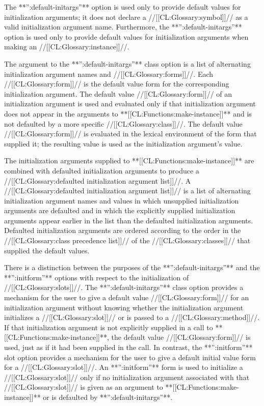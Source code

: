 The **'':default-initargs''** option is used only to provide default
values for initialization arguments; it does not declare a //[[CL:Glossary:symbol]]// 
as a valid initialization argument name.  Furthermore, 
the **'':default-initargs''** option is used only to provide default values for
initialization arguments when making an //[[CL:Glossary:instance]]//.
                     
The argument to the **'':default-initargs''** class 
option is a list of
alternating initialization argument names and //[[CL:Glossary:forms]]//.  
Each //[[CL:Glossary:form]]// is the
default  value form for the corresponding initialization
argument.  The default  value //[[CL:Glossary:form]]// of an initialization
argument is used and evaluated only if that initialization argument
does not appear in the arguments to **[[CL:Functions:make-instance]]** and is not
defaulted by a more specific //[[CL:Glossary:class]]//.  The default  value //[[CL:Glossary:form]]// is
evaluated in the lexical environment of the  form that
supplied it; the resulting value is used as the initialization
argument's value.
                                          
The initialization arguments supplied to **[[CL:Functions:make-instance]]** are combined
with defaulted initialization arguments to produce a 
//[[CL:Glossary:defaulted initialization argument list]]//. A 
//[[CL:Glossary:defaulted initialization argument list]]//
is a list of alternating initialization argument names and
values in which unsupplied initialization arguments are defaulted and in
which the explicitly supplied initialization arguments appear earlier in
the list than the defaulted initialization arguments.  Defaulted
initialization arguments are ordered according to the order in the 
//[[CL:Glossary:class precedence list]]// of the //[[CL:Glossary:classes]]// that supplied the default values.
                                                    
There is a distinction between the purposes of the 
**'':default-initargs''** and the **'':initform''** options with respect to the
initialization of //[[CL:Glossary:slots]]//.  The **'':default-initargs''** 
class option
provides a mechanism for the user to give a default  value //[[CL:Glossary:form]]//
for an initialization argument without knowing whether the
initialization argument initializes a //[[CL:Glossary:slot]]// 
or is passed to a //[[CL:Glossary:method]]//.
If that initialization argument is not explicitly supplied in a call
to **[[CL:Functions:make-instance]]**, the default  value //[[CL:Glossary:form]]// is used, just
as if it had been supplied in the call.  In contrast, the 
**'':initform''** slot option provides a mechanism for the user to give a
default initial value form for a //[[CL:Glossary:slot]]//.  An **'':initform''** form is
used to initialize a //[[CL:Glossary:slot]]// only if no initialization argument
associated with that //[[CL:Glossary:slot]]// is given as an argument to 
**[[CL:Functions:make-instance]]** or is defaulted by **'':default-initargs''**.

